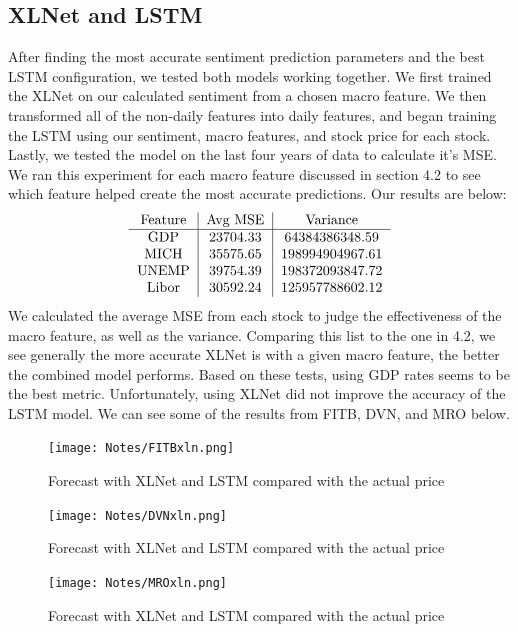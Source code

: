 \documentclass{article}
\begin{document}
\subsection{XLNet and LSTM}
After finding the most accurate sentiment prediction parameters and the best LSTM configuration, we tested both models working together. We first trained the XLNet on our calculated sentiment from a chosen macro feature. We then transformed all of the non-daily features into daily features, and began training the LSTM using our sentiment, macro features, and stock price for each stock. Lastly, we tested the model on the last four years of data to calculate it's MSE. We ran this experiment for each macro feature discussed in section 4.2 to see which feature helped create the most accurate predictions. Our results are below:
$$\begin{tabular}{c|c|c}
    Feature & Avg MSE & Variance \\ \hline
    GDP & 23704.33 & 64384386348.59  \\
    MICH & 35575.65 & 198994904967.61 \\
    UNEMP & 39754.39 & 198372093847.72\\
    Libor & 30592.24 & 125957788602.12 \\
\end{tabular}$$
We calculated the average MSE from each stock to judge the effectiveness of the macro feature, as well as the variance. Comparing this list to the one in 4.2, we see generally the more accurate XLNet is with a given macro feature, the better the combined model performs. Based on these tests, using GDP rates seems to be the best metric. Unfortunately, using XLNet did not improve the accuracy of the LSTM model. We can see some of the results from FITB, DVN, and MRO below.
\begin{figure}
    \centering
    \texttt{[image: Notes/FITBxln.png]}
    \caption{Forecast with XLNet and LSTM compared with the actual price}
\end{figure}
\begin{figure}
    \centering
    \texttt{[image: Notes/DVNxln.png]}
    \caption{Forecast with XLNet and LSTM compared with the actual price}
\end{figure}
\begin{figure}
    \centering
    \texttt{[image: Notes/MROxln.png]}
    \caption{Forecast with XLNet and LSTM compared with the actual price}
\end{figure}
\end{document}
